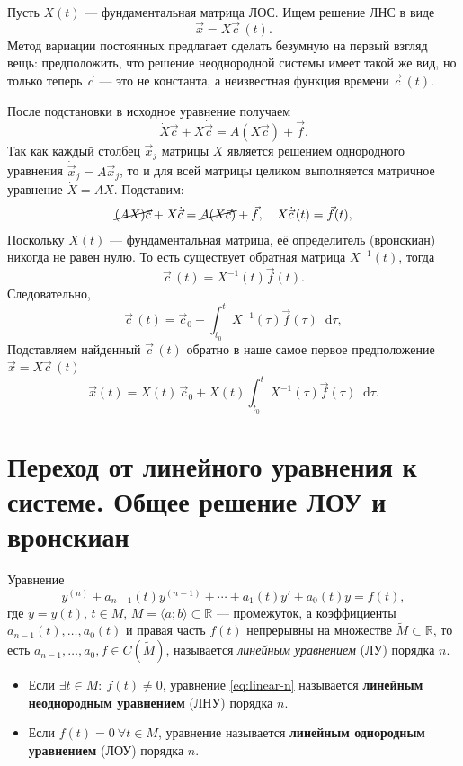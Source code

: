 \documentclass[12pt,a4paper]{article}
\numberwithin{equation}{section}
\newcommand{\R}{\mathbb{R}}
\newcommand{\vect}[1]{\vec{#1}}
\newcommand{\dd}{\mathop{}\!\mathrm{d}}
\DeclareRobustCommand{\examtag}[1]{\space{\normalfont\small\color{HSEgray}(#1)}}
\begin{document}
\begin{theoremHSE}
Пусть $X(t)$ --- фундаментальная матрица ЛОС. Ищем решение ЛНС в виде
\[
\vect{x}=X\vect{c}\,(t).
\]
Метод вариации постоянных предлагает сделать безумную на первый взгляд вещь: предположить, что решение неоднородной системы имеет такой же вид, но только теперь \(\vect{c}\) — это не константа, а неизвестная функция времени \(\vect{c}\,(t)\).

После подстановки в исходное уравнение получаем
\[
\dot{X}\vect{c}+X\dot{\vect{c}}=A(X\vect{c})+\vect{f}.
\]
Так как каждый столбец \(\vect{x}_j\) матрицы \(X\) является решением однородного уравнения \(\dot{\vect{x}}_j=A\vect{x}_j\), то и для всей матрицы целиком выполняется матричное уравнение \(\dot{X}=AX\). Подставим:
\begin{gather*}
\cancel{(AX)\vect{c}}+X\dot{\vect{c}}=\cancel{A(X\vect{c})}+\vect{f},\quad X\dot{\vect{c}}\,(t)=\vect{f}(t),
\end{gather*}
Поскольку \(X(t)\) --- фундаментальная матрица, её определитель (вронскиан) никогда не равен нулю. То есть существует обратная матрица \(X^{-1}(t)\), тогда
\[
\dot{\vect{c}}\,(t)=X^{-1}(t)\vect{f}(t).
\]
Следовательно,
\[
\vect{c}\,(t)=\vect{c}_0+
\int_{t_0}^{t}X^{-1}(\tau)\vect{f}(\tau)\dd\tau,
\]
Подставляем найденный \(\vect{c}\,(t)\) обратно в наше самое первое предположение \(\vect{x}=X\vect{c}\,(t)\)
\begin{equation}
\vect{x}(t)=
X(t)\,\vect{c}_0+
X(t)\int_{t_0}^{t}X^{-1}(\tau)\vect{f}(\tau)\dd\tau.
\label{eq:variation-system}
\end{equation}
\end{theoremHSE}

\section[Линейное уравнение и система\examtag{вопрос~17}]{Переход от линейного уравнения к системе. Общее решение ЛОУ и вронскиан\examtag{вопрос~17}}

\begin{definitionHSE}
Уравнение
\begin{equation}
y^{(n)}+a_{n-1}(t)y^{(n-1)}+\cdots+a_1(t)y'+a_0(t)y=f(t),
\label{eq:linear-n}
\end{equation}
где \(y=y(t)\), \(t\in M\), \(M=\langle a;b\rangle\subset\R\) --- промежуток, а коэффициенты \(a_{n-1}(t),\ldots,a_0(t)\) и правая часть \(f(t)\) непрерывны на множестве \(\tilde{M}\subset\R\), то есть \(a_{n-1},\ldots,a_0,f\in C(\tilde{M})\), называется \textit{линейным уравнением} (ЛУ) порядка \(n\).
\begin{itemize}
\item Если \(\exists t\in M:\ f(t)\neq0\), уравнение \eqref{eq:linear-n} называется \textbf{линейным неоднородным уравнением} (ЛНУ) порядка \(n\).
\item Если \(f(t)=0\ \forall t\in M\), уравнение называется \textbf{линейным однородным уравнением} (ЛОУ) порядка \(n\).
\end{itemize}
\end{definitionHSE}
\end{document}
